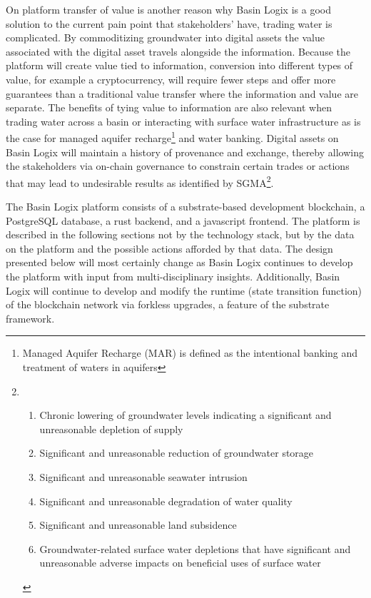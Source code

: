 \documentclass{tufte-handout}
\begin{document}
On platform transfer of value is another reason why Basin Logix is a good solution to the current pain point that stakeholders' have, trading water is complicated. By commoditizing groundwater into digital assets the value associated with the digital asset travels alongside the information. Because the platform will create value tied to information, conversion into different types of value, for example a cryptocurrency, will require fewer steps and offer more guarantees than a traditional value transfer where the information and value are separate. The benefits of tying value to information are also relevant when trading water across a basin or interacting with surface water infrastructure as is the case for managed aquifer recharge\footnote{Managed Aquifer Recharge (MAR) is defined as the intentional banking and treatment of waters in aquifers} and water banking. Digital assets on Basin Logix will maintain a history of provenance and exchange, thereby allowing the stakeholders via on-chain governance to constrain certain trades or actions that may lead to undesirable results as identified by SGMA\footnote{
\begin{enumerate}
  \item Chronic lowering of groundwater levels indicating a significant and unreasonable depletion of supply
  \item Significant and unreasonable reduction of groundwater storage
  \item Significant and unreasonable seawater intrusion
  \item Significant and unreasonable degradation of water quality
  \item Significant and unreasonable land subsidence
  \item Groundwater-related surface water depletions that have significant and unreasonable adverse impacts on beneficial uses of surface water
\end{enumerate}
}.   

The Basin Logix platform consists of a substrate-based development blockchain, a PostgreSQL database, a rust backend, and a javascript frontend. The platform is described in the following sections not by the technology stack, but by the data on the platform and the possible actions afforded by that data. The design presented below will most certainly change as Basin Logix continues to develop the platform with input from multi-disciplinary insights. Additionally, Basin Logix will continue to develop and modify the runtime (state transition function) of the blockchain network via forkless upgrades, a feature of the substrate framework.
\end{document}
